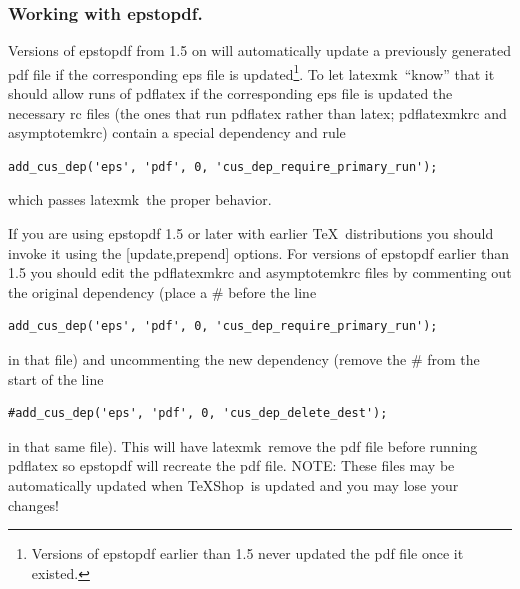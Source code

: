 \documentclass[11pt]{article}
\newcommand{\cmd}[1]{\textsf{#1}}
\newcommand{\TS}{\textsf{\TeX Shop}}
\newcommand{\latexmk}{\textsf{latexmk}}
\begin{document}
\subsubsection{Working with \cmd{epstopdf}.}

Versions of \cmd{epstopdf} from 1.5 on will automatically update a previously generated \cmd{pdf} file if the corresponding \cmd{eps} file is updated\footnote{Versions of \cmd{epstopdf} earlier than 1.5 never updated the \cmd{pdf} file once it existed.}. To let \latexmk\ ``know'' that it should allow runs of \cmd{pdflatex} if the corresponding \cmd{eps} file is updated the necessary \cmd{rc} files (the ones that run \cmd{pdflatex} rather than \cmd{latex}; \cmd{pdflatexmkrc} and \cmd{asymptotemkrc}) contain a special dependency and rule
\begin{verbatim}
add_cus_dep('eps', 'pdf', 0, 'cus_dep_require_primary_run');
\end{verbatim}
which passes \latexmk\ the proper behavior.

If you are using \cmd{epstopdf} 1.5 or later with earlier \TeX\ distributions you should invoke it using the \cmd{[update,prepend]} options. For versions of \cmd{epstopdf} earlier than 1.5 you should edit the \cmd{pdflatexmkrc} and \cmd{asymptotemkrc} files by commenting out the original dependency (place a \cmd{\#} before the line
\begin{verbatim}
add_cus_dep('eps', 'pdf', 0, 'cus_dep_require_primary_run');
\end{verbatim}
in that file) and uncommenting the new dependency (remove the \cmd{\#} from the start of the line
\begin{verbatim}
#add_cus_dep('eps', 'pdf', 0, 'cus_dep_delete_dest');
\end{verbatim}
in that same file). This will have \latexmk\ remove the \cmd{pdf} file before running \cmd{pdflatex} so \cmd{epstopdf} will recreate the \cmd{pdf} file. NOTE: These files may be automatically updated when \TS\ is updated and you may lose your changes!
\end{document}

